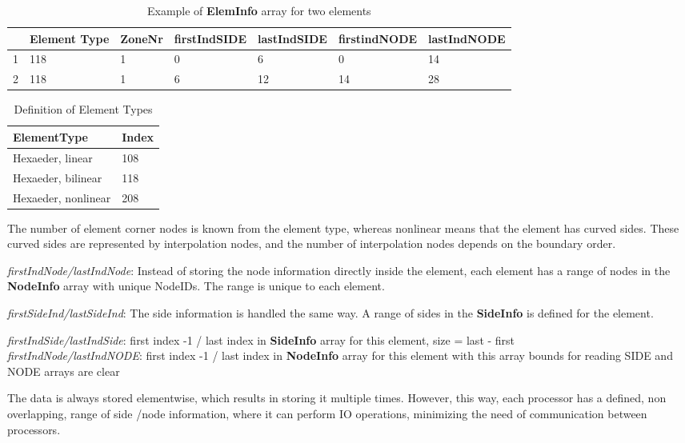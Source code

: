 \begin{table}[h!]
\centering
\begin{tabular}{|l|l|l|l|l|l|l|} \hline
  & Element Type & ZoneNr & firstIndSIDE & lastIndSIDE & firstindNODE & lastIndNODE \\ \hline
1 & 118 & 1 & 0 & 6 & 0 & 14 \\ \hline
2 & 118 & 1 & 6 & 12 & 14 & 28 \\ \hline
\end{tabular}
\caption{Example of \textbf{ElemInfo} array for two elements}
\end{table}

\begin{table}[h!]
\centering
\begin{tabularx}{0.4\textwidth}{|X|l|} \hline
ElementType        &Index\\ \hline
Hexaeder, linear   & 108  \\
Hexaeder, bilinear   & 118 \\
Hexaeder, nonlinear  & 208 \\ \hline
\end{tabularx}
\caption{Definition of Element Types}
\end{table}
The number of element corner nodes is known from the element type, whereas nonlinear means that the element has curved sides. These curved sides are represented by interpolation nodes, and the number of interpolation nodes depends on the boundary order.

\emph{firstIndNode/lastIndNode}: Instead of storing the node information directly inside the element, each element has a range of nodes in the \textbf{NodeInfo} array with unique NodeIDs. The range is unique to each element.

\emph{firstSideInd/lastSideInd}: The side information is handled the same way. A range of sides in the \textbf{SideInfo} is defined for the element.

\emph{firstIndSide/lastIndSide}: first index -1 / last index in \textbf{SideInfo} array for this element, size = last - first \\
\emph{firstIndNode/lastIndNODE}: first index -1 / last index in \textbf{NodeInfo} array for this element with this array bounds for reading SIDE and NODE arrays are clear

The data is always stored elementwise, which results in storing it multiple times. However, this way, each processor has a defined, non overlapping, range of side /node information, where it can perform IO operations, minimizing the need of communication between processors. 

